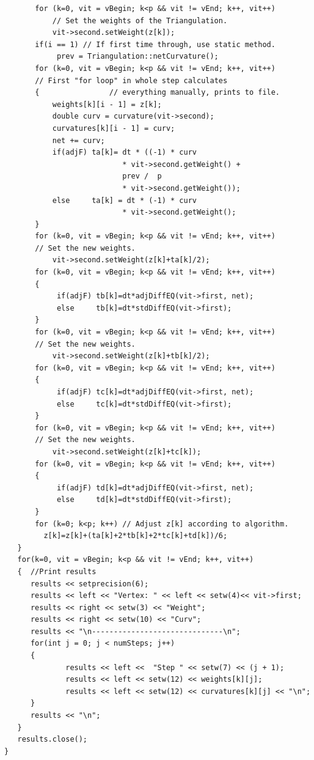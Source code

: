 \documentclass[12pt]{article}
\begin{document}
\begin{verbatim}
       for (k=0, vit = vBegin; k<p && vit != vEnd; k++, vit++)  
           // Set the weights of the Triangulation.
           vit->second.setWeight(z[k]);
       if(i == 1) // If first time through, use static method.
            prev = Triangulation::netCurvature();
       for (k=0, vit = vBegin; k<p && vit != vEnd; k++, vit++)  
       // First "for loop" in whole step calculates
       {                // everything manually, prints to file.
           weights[k][i - 1] = z[k];
           double curv = curvature(vit->second);
           curvatures[k][i - 1] = curv;
           net += curv;
           if(adjF) ta[k]= dt * ((-1) * curv 
                           * vit->second.getWeight() +
                           prev /  p
                           * vit->second.getWeight());
           else     ta[k] = dt * (-1) * curv 
                           * vit->second.getWeight();
       }
       for (k=0, vit = vBegin; k<p && vit != vEnd; k++, vit++)  
       // Set the new weights.
           vit->second.setWeight(z[k]+ta[k]/2);
       for (k=0, vit = vBegin; k<p && vit != vEnd; k++, vit++)  
       {
            if(adjF) tb[k]=dt*adjDiffEQ(vit->first, net);
            else     tb[k]=dt*stdDiffEQ(vit->first);
       }
       for (k=0, vit = vBegin; k<p && vit != vEnd; k++, vit++)  
       // Set the new weights.
           vit->second.setWeight(z[k]+tb[k]/2);
       for (k=0, vit = vBegin; k<p && vit != vEnd; k++, vit++)  
       {
            if(adjF) tc[k]=dt*adjDiffEQ(vit->first, net);
            else     tc[k]=dt*stdDiffEQ(vit->first);
       }
       for (k=0, vit = vBegin; k<p && vit != vEnd; k++, vit++)  
       // Set the new weights.
           vit->second.setWeight(z[k]+tc[k]);
       for (k=0, vit = vBegin; k<p && vit != vEnd; k++, vit++)  
       {
            if(adjF) td[k]=dt*adjDiffEQ(vit->first, net);
            else     td[k]=dt*stdDiffEQ(vit->first);
       }
       for (k=0; k<p; k++) // Adjust z[k] according to algorithm.
         z[k]=z[k]+(ta[k]+2*tb[k]+2*tc[k]+td[k])/6;
   }
   for(k=0, vit = vBegin; k<p && vit != vEnd; k++, vit++) 
   {  //Print results
      results << setprecision(6); 
      results << left << "Vertex: " << left << setw(4)<< vit->first;
      results << right << setw(3) << "Weight";
      results << right << setw(10) << "Curv";
      results << "\n------------------------------\n";
      for(int j = 0; j < numSteps; j++)
      {
              results << left <<  "Step " << setw(7) << (j + 1);
              results << left << setw(12) << weights[k][j];
              results << left << setw(12) << curvatures[k][j] << "\n";
      }
      results << "\n";
   }
   results.close();
}
\end{verbatim}
\end{document}
